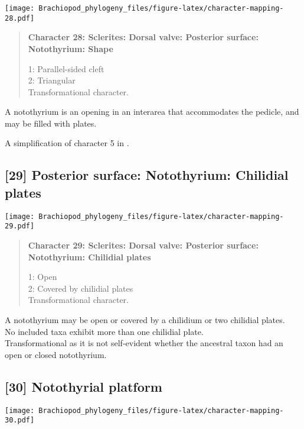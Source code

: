 \documentclass[openany]{book}
\theoremstyle{definition}
\theoremstyle{definition}
\theoremstyle{definition}
\theoremstyle{remark}
\begin{document}
\texttt{[image: Brachiopod\_phylogeny\_files/figure-latex/character-mapping-28.pdf]}

\begin{quote}
\textbf{Character 28: Sclerites: Dorsal valve: Posterior surface:
Notothyrium: Shape}

1: Parallel-sided cleft\\
2: Triangular\\
Transformational character.
\end{quote}

A notothyrium is an opening in an interarea that accommodates the
pedicle, and may be filled with plates.

A simplification of character 5 in
\citet{Bassett2001Functionalmorphology}.

\subsection*{{[}29{]} Posterior surface: Notothyrium: Chilidial
plates}\label{posterior-surface-notothyrium-chilidial-plates}

\texttt{[image: Brachiopod\_phylogeny\_files/figure-latex/character-mapping-29.pdf]}

\begin{quote}
\textbf{Character 29: Sclerites: Dorsal valve: Posterior surface:
Notothyrium: Chilidial plates}

1: Open\\
2: Covered by chilidial plates\\
Transformational character.
\end{quote}

A notothyrium may be open or covered by a chilidium or two chilidial
plates.\\
No included taxa exhibit more than one chilidial plate.\\
Transformational as it is not self-evident whether the ancestral taxon
had an open or closed notothyrium.

\subsection*{{[}30{]} Notothyrial platform}\label{notothyrial-platform}

\texttt{[image: Brachiopod\_phylogeny\_files/figure-latex/character-mapping-30.pdf]}
\end{document}
